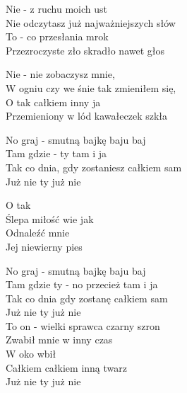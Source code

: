 \begin{text}
    Nie - z ruchu moich ust\\
    Nie odczytasz już najważniejszych słów\\
    To - co przesłania mrok\\
    Przezroczyste zło skradło nawet głos

    Nie - nie zobaczysz mnie,\\
    W ogniu czy we śnie tak zmieniłem się,\\
    O tak całkiem inny ja\\
    Przemieniony w lód kawałeczek szkła

    No graj - smutną bajkę baju baj\\
    Tam gdzie - ty tam i ja\\
    Tak co dnia, gdy zostaniesz całkiem sam\\
    Już nie ty już nie

    O tak\\
    Ślepa miłość wie jak\\
    Odnaleźć mnie\\
    Jej niewierny pies

    No graj - smutną bajkę baju baj\\
    Tam gdzie ty - no przecież tam i ja\\
    Tak co dnia gdy zostanę całkiem sam\\
    Już nie ty już nie\\
    To on - wielki sprawca czarny szron\\
    Zwabił mnie w inny czas\\
    W oko wbił\\
    Całkiem całkiem inną twarz\\
    Już nie ty już nie
\end{text}
\begin{chord}

\end{chord}